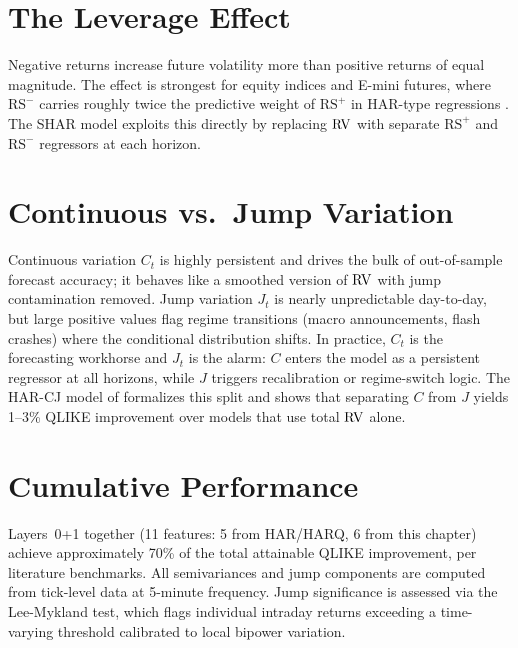 \section{The Leverage Effect}
\label{sec:leverage-effect}

Negative returns increase future volatility more than positive returns of equal magnitude.
The effect is strongest for equity indices and E-mini futures, where $\mathrm{RS}^{-}$ carries roughly twice the predictive weight of $\mathrm{RS}^{+}$ in HAR-type regressions \citep{PattonSheppard2015}.
The SHAR model exploits this directly by replacing $\operatorname{RV}$ with separate $\mathrm{RS}^{+}$ and $\mathrm{RS}^{-}$ regressors at each horizon.


\section{Continuous vs.\ Jump Variation}
\label{sec:continuous-vs-jump}

Continuous variation $C_t$ is highly persistent and drives the bulk of out-of-sample forecast accuracy; it behaves like a smoothed version of $\operatorname{RV}$ with jump contamination removed.
Jump variation $J_t$ is nearly unpredictable day-to-day, but large positive values flag regime transitions (macro announcements, flash crashes) where the conditional distribution shifts.
In practice, $C_t$ is the forecasting workhorse and $J_t$ is the alarm: $C$ enters the model as a persistent regressor at all horizons, while $J$ triggers recalibration or regime-switch logic.
The HAR-CJ model of \citet{ABD2007} formalizes this split and shows that separating $C$ from $J$ yields 1--3\% QLIKE improvement over models that use total $\operatorname{RV}$ alone.


\section{Cumulative Performance}
\label{sec:cumulative-l1}

Layers~0+1 together (11 features: 5 from HAR/HARQ, 6 from this chapter) achieve approximately 70\% of the total attainable QLIKE improvement, per literature benchmarks.
All semivariances and jump components are computed from tick-level data at 5-minute frequency.
Jump significance is assessed via the Lee-Mykland test, which flags individual intraday returns exceeding a time-varying threshold calibrated to local bipower variation.


